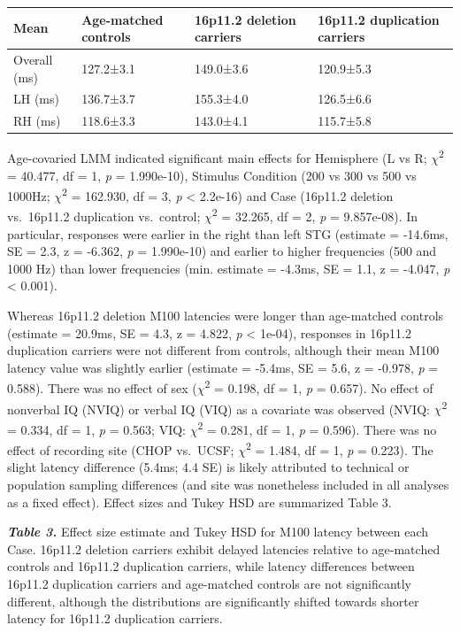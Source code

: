 \documentclass[]{article}
\begin{document}
\begin{longtable}[c]{@{}llll@{}}
\toprule
Mean & Age-matched controls & 16p11.2 deletion carriers & 16p11.2
duplication carriers\tabularnewline
\midrule
\endhead
Overall (ms) & 127.2±3.1 & 149.0±3.6 & 120.9±5.3\tabularnewline
LH (ms) & 136.7±3.7 & 155.3±4.0 & 126.5±6.6\tabularnewline
RH (ms) & 118.6±3.3 & 143.0±4.1 & 115.7±5.8\tabularnewline
\bottomrule
\end{longtable}

\medskip

Age-covaried LMM indicated significant main effects for Hemisphere (L vs
R; \(\chi\)\textsuperscript{2} = 40.477, df = 1, \emph{p} = 1.990e-10),
Stimulus Condition (200 vs 300 vs 500 vs 1000Hz;
\(\chi\)\textsuperscript{2} = 162.930, df = 3, \emph{p} \textless{}
2.2e-16) and Case (16p11.2 deletion vs.~16p11.2 duplication vs.~control;
\(\chi\)\textsuperscript{2} = 32.265, df = 2, \emph{p} = 9.857e-08). In
particular, responses were earlier in the right than left STG (estimate
= -14.6ms, SE = 2.3, z = -6.362, \emph{p} = 1.990e-10) and earlier to
higher frequencies (500 and 1000 Hz) than lower frequencies (min.
estimate = -4.3ms, SE = 1.1, z = -4.047, \emph{p} \textless{} 0.001).

\medskip

Whereas 16p11.2 deletion M100 latencies were longer than age-matched
controls (estimate = 20.9ms, SE = 4.3, z = 4.822, \emph{p} \textless{}
1e-04), responses in 16p11.2 duplication carriers were not different
from controls, although their mean M100 latency value was slightly
earlier (estimate = -5.4ms, SE = 5.6, z = -0.978, \emph{p} = 0.588).
There was no effect of sex (\(\chi\)\textsuperscript{2} = 0.198, df = 1,
\emph{p} = 0.657). No effect of nonverbal IQ (NVIQ) or verbal IQ (VIQ)
as a covariate was observed (NVIQ: \(\chi\)\textsuperscript{2} = 0.334,
df = 1, \emph{p} = 0.563; VIQ: \(\chi\)\textsuperscript{2} = 0.281, df =
1, \emph{p} = 0.596). There was no effect of recording site (CHOP
vs.~UCSF; \(\chi\)\textsuperscript{2} = 1.484, df = 1, \emph{p} =
0.223). The slight latency difference (5.4ms; 4.4 SE) is likely
attributed to technical or population sampling differences (and site was
nonetheless included in all analyses as a fixed effect). Effect sizes
and Tukey HSD are summarized Table 3.

\medskip

\textbf{\emph{Table 3.}} Effect size estimate and Tukey HSD for M100
latency between each Case. 16p11.2 deletion carriers exhibit delayed
latencies relative to age-matched controls and 16p11.2 duplication
carriers, while latency differences between 16p11.2 duplication carriers
and age-matched controls are not significantly different, although the
distributions are significantly shifted towards shorter latency for
16p11.2 duplication carriers.
\end{document}
